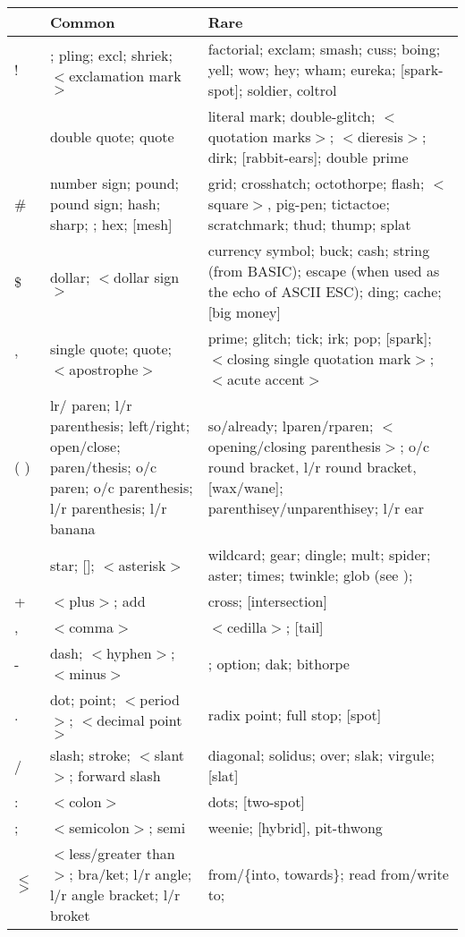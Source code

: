 \renewcommand{\arraystretch}{1.3}
\begin{longtable}{>{\raggedright\arraybackslash}p{1cm}%
		>{\raggedright\arraybackslash}p{}%
		>{\raggedright\arraybackslash}p{}}
	\toprule
	&\textbf{Common}&\textbf{Rare}\\
	\midrule
	!&\citeentry{bang}; pling; excl; shriek; $<$exclamation mark$>$&factorial; exclam; smash; cuss; boing; yell; wow; hey; wham; eureka;
	[spark-spot]; soldier, coltrol\\
	\textquotedbl\textquotedbl&double quote; quote&literal mark; double-glitch; $<$quotation marks$>$; $<$dieresis$>$; dirk; [rabbit-ears];
	double prime\\
	\#&number sign; pound; pound sign; hash; sharp; \citeentry{crunch}; hex; [mesh]&grid; crosshatch; octothorpe; flash; $<$square$>$,
	pig-pen; tictactoe; scratchmark; thud; thump; splat\\
	\$&dollar; $<$dollar sign$>$&currency symbol; buck; cash; string (from BASIC); escape (when used as the echo of ASCII ESC); ding; cache;
	[big money]\\
	'&single quote; quote; $<$apostrophe$>$&prime; glitch; tick; irk; pop; [spark]; $<$closing single quotation mark$>$; $<$acute
	accent$>$\\
	( )&lr/ paren; l/r parenthesis; left/right; open/close; paren/thesis; o/c paren; o/c parenthesis; l/r parenthesis; l/r
	banana&so/already; lparen/rparen; $<$opening/closing parenthesis$>$; o/c round bracket, l/r round bracket, [wax/wane];
	parenthisey/unparenthisey; l/r ear\\
	*&star; [\citeentry{splat}]; $<$asterisk$>$&wildcard; gear; dingle; mult; spider; aster; times; twinkle; glob (see \citeentry{glob});
	\citeentry{Nathan Hale}\\
	+&$<$plus$>$; add&cross; [intersection]\\
	,&$<$comma$>$&$<$cedilla$>$; [tail]\\
	-&dash; $<$hyphen$>$; $<$minus$>$&[worm]; option; dak; bithorpe\\
	.&dot; point; $<$period$>$; $<$decimal point$>$&radix point; full stop; [spot]\\
	/&slash; stroke; $<$slant$>$; forward slash&diagonal; solidus; over; slak; virgule; [slat]\\
	:&$<$colon$>$&dots; [two-spot]\\
	;&$<$semicolon$>$; semi&weenie; [hybrid], pit-thwong\\
	$<$ $>$&$<$less/greater than$>$; bra/ket; l/r angle; l/r angle bracket; l/r broket&from/\{into, towards\}; read from/write to;

\end{longtable}
